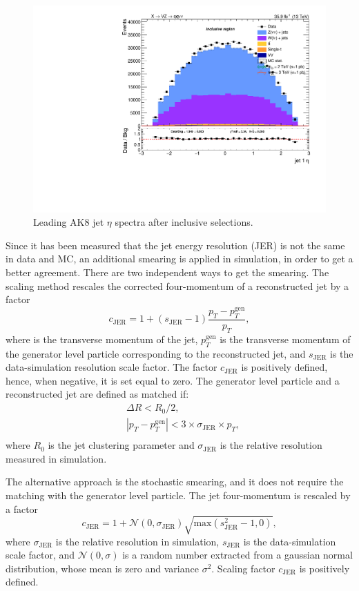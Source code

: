 \begin{figure}[!htb]
  \begin{center}
    \includegraphics[width=.495\textwidth]{plots/v9_thesis/XVZnnInc/FatJet1_eta.pdf}
  \end{center}
  \caption{Leading AK8 jet $\eta$ spectra after inclusive selections.}
  \label{fig:AK8jet_eta}
\end{figure}

\noindent Since it has been measured that the jet energy resolution (JER) is not the same in data and MC, an additional smearing is applied in simulation, in order to get a better agreement. There are two independent ways to get the smearing. The scaling method rescales the corrected four-momentum of a reconstructed jet by a factor
\begin{equation}
c_{\text{JER}} = 1 + (s_{\text{JER}} - 1) \frac{p_T - p_T^{\text{gen}}}{p_T},
\end{equation}
where \pt is the transverse momentum of the jet, $p_T^{\text{gen}}$ is the transverse momentum of the generator level particle corresponding to the reconstructed jet, and $s_{\text{JER}}$ is the data-simulation resolution scale factor. The factor $c_{\text{JER}}$ is positively defined, hence, when negative, it is set equal to zero. %
The generator level particle and a reconstructed jet are defined as matched if:
\begin{equation}
\begin{split}
& \Delta R < R_{0} / 2, \\
&  |p_T - p_T^{\text{gen}}| < 3 \times \sigma_{\text{JER}} \times p_{T}, \\
\end{split}
\end{equation}
where $R_{0}$ is the jet clustering parameter and $\sigma_{\text{JER}}$ is the relative \pt resolution measured in simulation.

\noindent The alternative approach is the stochastic smearing, and it does not require the matching with the generator level particle. The jet four-momentum is rescaled by a factor
\begin{equation}
c_{\text{JER}} = 1 + \mathcal{N}(0, \sigma_{\text{JER}}) \sqrt{\text{max}(s_{\text{JER}}^2 - 1, 0)},
\end{equation}
where $\sigma_{\text{JER}}$ is the relative \pt resolution in simulation, $s_{\text{JER}}$ is the data-simulation scale factor, and $\mathcal{N}(0, \sigma)$ 
is a random number extracted from a gaussian normal distribution, whose mean is zero and variance $\sigma^2$. Scaling factor $c_{\text{JER}}$ is positively defined.%

